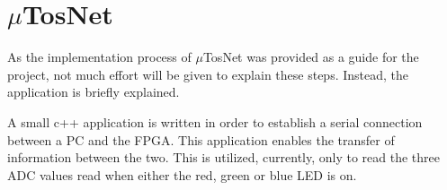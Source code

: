\section{$\mu$TosNet}
As the implementation process of $\mu$TosNet was provided as a guide for the project, not much effort will be given to explain these steps. 
Instead, the application is briefly explained.

A small c++ application is written in order to establish a serial connection between a PC and the FPGA.
This application enables the transfer of information between the two. 
This is utilized, currently, only to read the three ADC values read when either the red, green or blue LED is on.